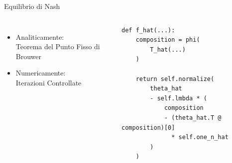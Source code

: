 \begin{frame}[fragile]{Equilibrio di Nash}

\begin{columns}[c]


    \begin{itemize}
        \item Analiticamente:\\Teorema del Punto Fisso di Brouwer
        \item Numericamente:\\Iterazioni Controllate
    \end{itemize}


    \begin{lstlisting}[style=myStile]
def f_hat(...):
    composition = phi(
        T_hat(...)
    )

    return self.normalize(
        theta_hat
        - self.lmbda * (
            composition
            - (theta_hat.T @ composition)[0]
              * self.one_n_hat
        )
    )
\end{lstlisting}

\end{columns}

\end{frame}
